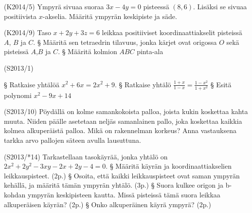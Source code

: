 \begin{tehtava}(K2014/5)
Ympyrä sivuaa suoraa $3x-4y=0$ pisteessä $(8,6)$. Lisäksi se sivuaa positiivista $x$-akselia.
Määritä ympyrän keskipiste ja säde. 
\end{tehtava}


\begin{tehtava}(K2014/9)
Taso $x+2y+3z=6$ leikkaa positiiviset koordinaattiakselit pisteissä $A$, $B$ ja $C$.
\alakohdat
		§ Määritä sen tetraedrin tilavuus, jonka kärjet ovat origossa $O$ sekä pisteissä $A$,$B$ ja $C$. 
		§ Määritä kolmion $ABC$ pinta-ala
	\loppu
\end{tehtava}

\begin{tehtava} (S2013/1)

\alakohdat
		§ Ratkaise yhtälöä $x^2+6x=2x^2+9$.
		§ Ratkaise yhtälö $\frac{1+x}{1-x}=\frac{1-x^2}{1+x^2}$
		§ Esitä polynomi $x^2-9x+14$
	\loppu
\end{tehtava}

\begin{tehtava}(S2013/10)
Pöydällä on kolme samankokoista palloa, joista kukin koskettaa kahta muuta. Niiden päälle asetetaan neljäs samanlainen  pallo, joka koskettaa kaikkia kolmea alkuperäistä palloa.
Mikä on rakennelman korkeus? Anna vastauksena tarkka arvo pallojen säteen avulla lausuttuna. 
\end{tehtava}

\begin{tehtava} (S2013/*14)
Tarkastellaan tasokäyrää, jonka yhtälö on $2x^2+2y^2-3xy-2x+2y-4=0$.
\alakohdat
		§ Määritä käyrän ja koordinaattiakselien leikkauspisteet. (2p.)
		§ Osoita, että kaikki leikkauspisteet ovat saman ympyrän kehällä, ja määritä tämän ympyrän yhtälö. (3p.)
		§ Suora kulkee origon ja b-kohdan ympyrän keskipisteen kautta. Missä pisteissä tämä suora leikkaa alkuperäisen käyrän? (2p.)
		§ Onko alkuperäinen käyrä ympyrä? (2p.)
	\loppu
\end{tehtava}

